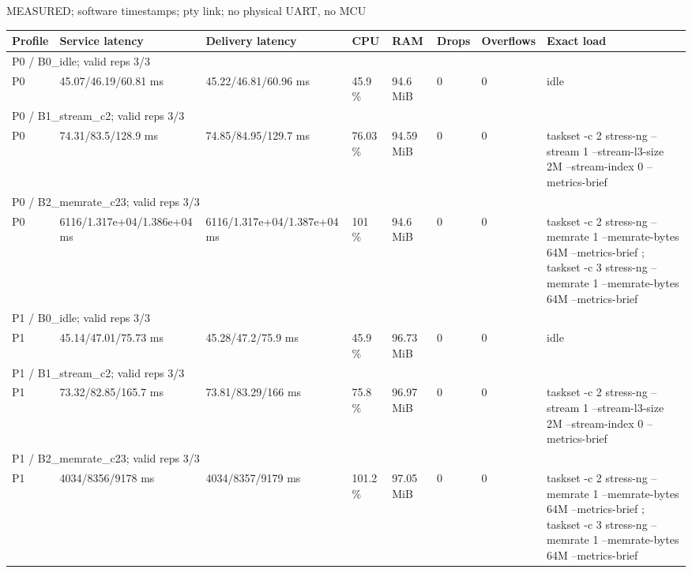 \par\noindent MEASURED; software timestamps; pty link; no physical UART, no MCU\par
\begin{tabular}{llllllll}
\toprule
Profile & Service latency & Delivery latency & CPU & RAM & Drops & Overflows & Exact load \\
\midrule
\multicolumn{8}{l}{P0 / B0\_idle; valid reps 3/3} \\
P0 & 45.07/46.19/60.81 ms & 45.22/46.81/60.96 ms & 45.9 \% & 94.6 MiB & 0 & 0 & idle \\
\multicolumn{8}{l}{P0 / B1\_stream\_c2; valid reps 3/3} \\
P0 & 74.31/83.5/128.9 ms & 74.85/84.95/129.7 ms & 76.03 \% & 94.59 MiB & 0 & 0 & taskset -c 2 stress-ng --stream 1 --stream-l3-size 2M --stream-index 0 --metrics-brief \\
\multicolumn{8}{l}{P0 / B2\_memrate\_c23; valid reps 3/3} \\
P0 & 6116/1.317e+04/1.386e+04 ms & 6116/1.317e+04/1.387e+04 ms & 101 \% & 94.6 MiB & 0 & 0 & taskset -c 2 stress-ng --memrate 1 --memrate-bytes 64M --metrics-brief ; taskset -c 3 stress-ng --memrate 1 --memrate-bytes 64M --metrics-brief \\
\multicolumn{8}{l}{P1 / B0\_idle; valid reps 3/3} \\
P1 & 45.14/47.01/75.73 ms & 45.28/47.2/75.9 ms & 45.9 \% & 96.73 MiB & 0 & 0 & idle \\
\multicolumn{8}{l}{P1 / B1\_stream\_c2; valid reps 3/3} \\
P1 & 73.32/82.85/165.7 ms & 73.81/83.29/166 ms & 75.8 \% & 96.97 MiB & 0 & 0 & taskset -c 2 stress-ng --stream 1 --stream-l3-size 2M --stream-index 0 --metrics-brief \\
\multicolumn{8}{l}{P1 / B2\_memrate\_c23; valid reps 3/3} \\
P1 & 4034/8356/9178 ms & 4034/8357/9179 ms & 101.2 \% & 97.05 MiB & 0 & 0 & taskset -c 2 stress-ng --memrate 1 --memrate-bytes 64M --metrics-brief ; taskset -c 3 stress-ng --memrate 1 --memrate-bytes 64M --metrics-brief \\
\bottomrule
\end{tabular}
